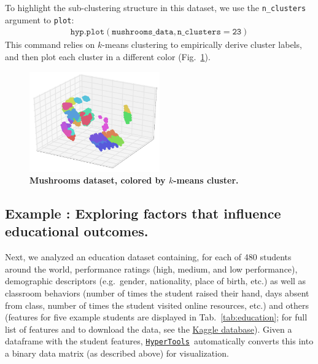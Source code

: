 \documentclass[12pt,letterpaper]{article}
\newcommand{\hypertools}{\href{https://github.com/ContextLab/hypertools}{\texttt{HyperTools}}}
\newcounter{example}
\begin{document}
To highlight the sub-clustering structure in this dataset,  we use the \texttt{n\_clusters} argument to \texttt{plot}:
\begin{align}
\mathtt{hyp.plot(mushrooms\_data, n\_clusters=23)}
\end{align}
This command relies on $k$-means clustering to empirically derive cluster labels, and then plot each cluster in a different color (Fig.~\ref{fig:mushclust}).

\begin{figure}[tbp]
\centering
\includegraphics[width=0.5\textwidth]{mushrooms2}
\caption{\textbf{Mushrooms dataset, colored by $k$-means cluster.}} \label{fig:mushclust}
\end{figure}






\subsection*{Example : Exploring factors that influence educational outcomes.}
Next, we analyzed an education dataset containing, for each of 480 students around the world, performance ratings (high, medium, and low performance), demographic descriptors (e.g.\ gender, nationality, place of birth, etc.) as well as classroom behaviors (number of times the student raised their hand, days absent from class, number of times the student visited online resources, etc.) and others (features for five example students are displayed in Tab.~\ref{tab:education}; for full list of features and to download the data, see the \href{https://www.kaggle.com/aljarah/xAPI-Edu-Data}{Kaggle database}).  Given a dataframe with the student features, \hypertools~automatically converts this into a binary data matrix (as described above) for visualization.
\end{document}
